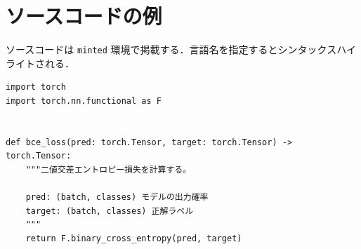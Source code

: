 \documentclass[../main.tex]{subfiles}
\begin{document}
\section{ソースコードの例}
ソースコードは \texttt{minted} 環境で掲載する．言語名を指定するとシンタックスハイライトされる．
\begin{verbatim}
import torch
import torch.nn.functional as F


def bce_loss(pred: torch.Tensor, target: torch.Tensor) -> torch.Tensor:
    """二値交差エントロピー損失を計算する。

    pred: (batch, classes) モデルの出力確率
    target: (batch, classes) 正解ラベル
    """
    return F.binary_cross_entropy(pred, target)
\end{verbatim}
\end{document}

